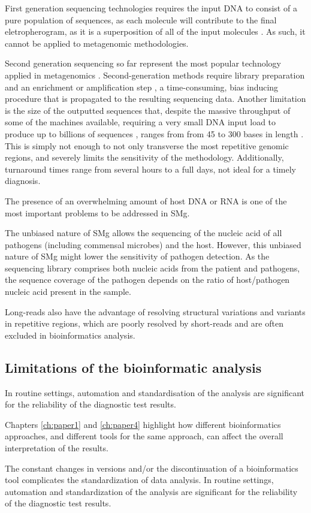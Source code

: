 First generation sequencing technologies requires the input \ac{DNA} to consist of a pure population of sequences, as each molecule will contribute to the final eletropherogram, as it is a superposition of all of the input molecules \citep{hagemann_overview_2015}. As such, it cannot be applied to metagenomic methodologies. 

Second generation sequencing so far represent the most popular technology applied in metagenomics \citep{rossen_practical_2018, loman_twenty_2015, loman_high-throughput_2012}. Second-generation methods require library preparation and an enrichment or amplification step \citep{hagemann_overview_2015}, a time-consuming, bias inducing procedure that is propagated to the resulting sequencing data. Another limitation is the size of the outputted sequences that, despite the massive throughput of some of the machines available, requiring a very small \ac{DNA} input load to produce up to billions of sequences \citep{loman_twenty_2015}, ranges from from 45 to 300 bases in length \citep{loman_performance_2012}. This is simply not enough to not only transverse the most repetitive genomic regions, and severely limits the sensitivity of the methodology. Additionally, turnaround times range from several hours to a full days, not ideal for a timely diagnosis.

The presence of an overwhelming amount of host \ac{DNA} or \ac{RNA} is one of the most important problems to be addressed in \ac{SMg}.

The unbiased nature of \ac{SMg} allows the sequencing of the nucleic acid of all pathogens (including commensal microbes) and the host. However, this unbiased nature of SMg might lower the sensitivity of pathogen detection. As the sequencing library comprises both nucleic acids from the patient and pathogens, the sequence coverage of the pathogen depends on the ratio of host/pathogen nucleic acid present in the sample. 

Long-reads also have the advantage of resolving structural variations and variants in repetitive regions, which are poorly resolved by short-reads and are often excluded in bioinformatics analysis. 

\subsection{Limitations of the bioinformatic analysis}

In routine settings, automation and standardisation of the analysis are significant for the reliability of the diagnostic test results. 

Chapters \ref{ch:paper1} and \ref{ch:paper4} highlight how different bioinformatics approaches, and different tools for the same approach, can affect the overall interpretation of the results. 

The constant changes in versions and/or the discontinuation of a bioinformatics tool complicates the standardization of data analysis. In routine settings, automation and standardization of the analysis are significant for the reliability of the diagnostic test results.

